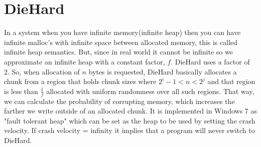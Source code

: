 \documentclass[twoside]{article}
\begin{document}
\section{DieHard}
In a system when you have infinite memory(infinite heap) then you can have infinite malloc's with infinite space between allocated memory, this is called infinite heap semantics.
But, since in real world it cannot be infinite so we approximate an infinite heap with a constant factor, $f$. DieHard uses a factor of 2. So, when allocation of $n$ bytes is requested, DieHard basically allocates a chunk
from a region that holds chunk sizes where $2^i-1<n<2^j$ and that region is less than $\frac{1}{f}$ allocated with uniform randomness over all such regions. That way, we can calculate the probability of corrupting memory,
which increases the farther we write outside of an allocated chunk.
It is implemented in Windows 7 as "fault tolerant heap" which can be set as the heap to be used by setting the crash velocity. If crash velocity = infinity it implies that a program will never switch to DieHard.
\end{document}
